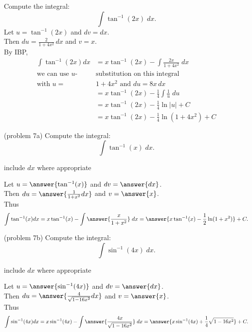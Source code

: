 \documentclass{ximera}
\begin{document}
\begin{example}[example 7]
Compute the integral:
  \[
  \int \tan^{-1}(2x) \;dx.
  \]
Let $u = \tan^{-1}(2x)$   and   $dv = dx$.\\
  Then $du = \frac{2}{1+4x^2}\, dx$   and   $v = x$.\\
By IBP,
  \begin{align*}
  \int  \tan^{-1}(2x) dx &= x\tan^{-1}(2x) - \int \frac{2x}{1+4x^2} \;dx\\
  \text{we can use $u$-} & \text{substitution on this integral} \\
  \text{with $u =$} &  1+4x^2 \text{ and } du = 8x \, dx \\
  &= x\tan^{-1}(2x) - \frac14 \int \frac{1}{u} \; du\\
  &= x\tan^{-1}(2x) - \frac14 \ln|u| + C\\
  &= x\tan^{-1}(2x) - \frac14 \ln(1+4x^2) + C
  \end{align*}
  
\end{example}

\begin{problem}(problem 7a)
Compute the integral:
  \[
  \int \tan^{-1}(x) \;dx.
  \]
\begin{hint}
      include $dx$ where appropriate
  \end{hint}
  Let $u = \answer{\tan^{-1}(x)}$   and   $dv = \answer{dx}$.\\
  Then $du = \answer{\frac{1}{1+x^2} dx}$   and   $v = \answer{x}$.\\
  Thus 
  \[
  \int \tan^{-1}(x) dx = x\tan^{-1}(x) - \int \answer{\frac{x}{1+x^2}} \;dx = \answer{x\tan^{-1}(x) -\frac12 \ln(1+x^2)} + C.
  \]
\end{problem}

\begin{problem}(problem 7b)
Compute the integral:
  \[
  \int \sin^{-1}(4x) \;dx.
  \]
\begin{hint}
      include $dx$ where appropriate
  \end{hint}
  Let $u = \answer{\sin^{-1}(4x)}$   and   $dv = \answer{dx}$.\\
  Then $du = \answer{\frac{4}{\sqrt{1-16x^2}} dx}$   and   $v = \answer{x}$.\\
  Thus 
  \[
  \int \sin^{-1}(4x) dx = x\sin^{-1}(4x) - \int \answer{\frac{4x}{\sqrt{1-16x^2}}} \;dx = \answer{x\sin^{-1}(4x) +\frac14 \sqrt{1-16x^2}} + C.
  \]
\end{problem}
\end{document}
